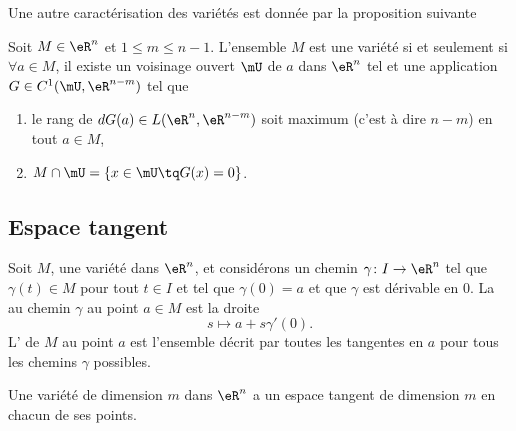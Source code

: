 Une autre caractérisation des variétés est donnée par la proposition suivante %
\begin{proposition}     \label{PropCarVarZerFonc}
    Soit $M\in \eR^n$ et $1\leq m\leq n-1$. L'ensemble $M$ est une variété si et seulement si $\forall a\in M$, il existe un voisinage ouvert $\mU$ de $a$ dans $\eR^n$ tel et une application $G\in C^1(\mU,\eR^{n-m})$ tel que
    \begin{enumerate}

        \item
            le rang de $dG(a)\in L(\eR^n,\eR^{n-m})$ soit maximum (c'est à dire $n-m$) en tout $a\in M$,
        \item
            $M\cap\mU=\{ x\in\mU\tq G(x)=0 \}$.

    \end{enumerate}
\end{proposition}

\subsection{Espace tangent}

Soit $M$, une variété dans $\eR^n$, et considérons un chemin $\gamma\colon I\to \eR^n$ tel que $\gamma(t)\in M$ pour tout $t\in I$ et tel que $\gamma(0)=a$ et que $\gamma$ est dérivable en $0$. La  au chemin $\gamma$ au point $a\in M$ est la droite
\begin{equation}
    s\mapsto a+s\gamma'(0).
\end{equation}
L' de $M$ au point $a$ est l'ensemble décrit par toutes les tangentes en $a$ pour tous les chemins $\gamma$ possibles.

\begin{proposition}         \label{PropDimEspTanVarConst}
    Une variété de dimension $m$ dans $\eR^n$ a un espace tangent de dimension $m$ en chacun de ses points.
\end{proposition}
